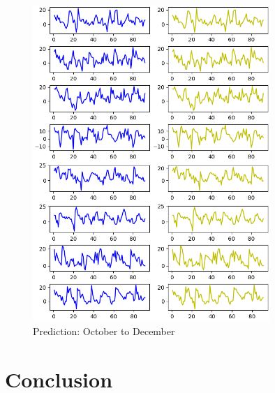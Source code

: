 \documentclass[12pt]{article}
\begin{document}
\begin{figure}[htpb]
	\centering
	\includegraphics[width=0.8\textwidth]{pic/Predicted-and-Tested_4.png}
	\caption{Prediction: October to December}
	\label{Fig:pred-4}
\end{figure}

\section{Conclusion}


\end{document}

